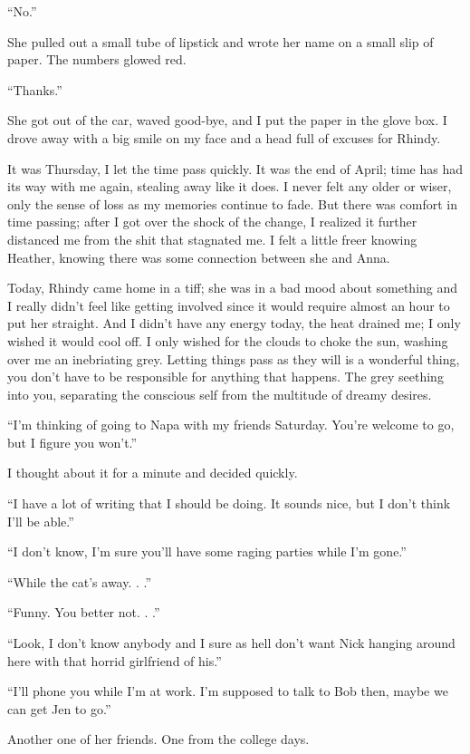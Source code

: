 ``No.''

She pulled out a small tube of lipstick and wrote her name on a small
slip of paper. The numbers glowed red.

``Thanks.''

She got out of the car, waved good-bye, and I put the paper in the glove
box. I drove away with a big smile on my face and a head full of excuses
for Rhindy.

It was Thursday, I let the time pass quickly. It was the end of April;
time has had its way with me again, stealing away like it does. I never
felt any older or wiser, only the sense of loss as my memories continue
to fade. But there was comfort in time passing; after I got over the
shock of the change, I realized it further distanced me from the shit
that stagnated me. I felt a little freer knowing Heather, knowing there
was some connection between she and Anna.

Today, Rhindy came home in a tiff; she was in a bad mood about something
and I really didn't feel like getting involved since it would require
almost an hour to put her straight. And I didn't have any energy today,
the heat drained me; I only wished it would cool off. I only wished for
the clouds to choke the sun, washing over me an inebriating grey.
Letting things pass as they will is a wonderful thing, you don't have to
be responsible for anything that happens. The grey seething into you,
separating the conscious self from the multitude of dreamy desires.

``I'm thinking of going to Napa with my friends Saturday. You're welcome
to go, but I figure you won't.''

I thought about it for a minute and decided quickly.

``I have a lot of writing that I should be doing. It sounds nice, but I
don't think I'll be able.''

``I don't know, I'm sure you'll have some raging parties while I'm
gone.''

``While the cat's away. . .''

``Funny. You better not. . .''

``Look, I don't know anybody and I sure as hell don't want Nick hanging
around here with that horrid girlfriend of his.''

``I'll phone you while I'm at work. I'm supposed to talk to Bob then,
maybe we can get Jen to go.''

Another one of her friends. One from the college days.

